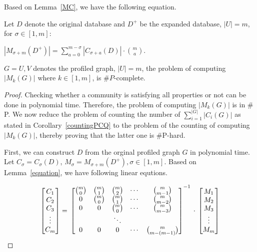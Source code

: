 Based on Lemma~\ref{MC}, we have the following equation.

\begin{lemma}
\label{equation}
Let $D$ denote the original database and $D^+$ be the expanded database, $|U|=m$, for $\sigma \in [1,m]$:

$|M_{\sigma +m}(D^+)| = \displaystyle{\sum_{a=0}^{m-\sigma}}|C_{\sigma +a}(D)| \cdot \binom{m}{a}$.
\end{lemma}

\begin{theorem}
$G={U,V}$ denotes the profiled graph, $|U|=m$, the problem of computing $|M_k(G)|$ where $k \in [1,m]$, is $\#P$-complete.
\end{theorem}

\begin{proof}
Checking whether a community is satisfying all properties or not can be done in polynomial time. Therefore, the problem of computing $|M_k(G)|$ is in $\#$P. We now reduce the problem of counting the number of $\sum_{i=1}^{|G|}{|C_i(G)|}$ as stated in Corollary~\ref{countingPCQ} to the problem of the counting of computing $|M_k(G)|$, thereby proving that the latter one is $\#$P-hard.

First, we can construct $D$ from the orginal profiled graph $G$ in polynomial time. Let $C_\sigma =C_{\sigma}(D)$, $M_\sigma=M_{\sigma+m}(D^+), \sigma \in [1,m]$. Based on Lemma~\ref{equation}, we have following linear equtions. 

$$
\left[
\begin{matrix}
C_1 \\ C_2 \\C_3 \\\vdots\\ C_m
\end{matrix}
\right]=\\
\left[
\begin{matrix}
 \binom{m}{0}  & \binom{m}{1} & \binom{m}{2} & \cdots & \binom{m}{m-1}     \\
 0 			   & \binom{m}{0} & \binom{m}{1} & \cdots & \binom{m}{m-2}     \\
 0 			   & 0            & \binom{m}{0} & \cdots & \binom{m}{m-3}     \\
 			   & 			  &				   \ddots				   	   \\
 0 			   & 0            & 0			 & \cdots & \binom{m}{m-(m-1)} \\
\end{matrix}
\right]^{-1} \\
\cdot \\
\left[
\begin{matrix}
M_1 \\ M_2 \\M_3 \\\vdots\\ M_m
\end{matrix}
\right]
$$



\end{proof}
